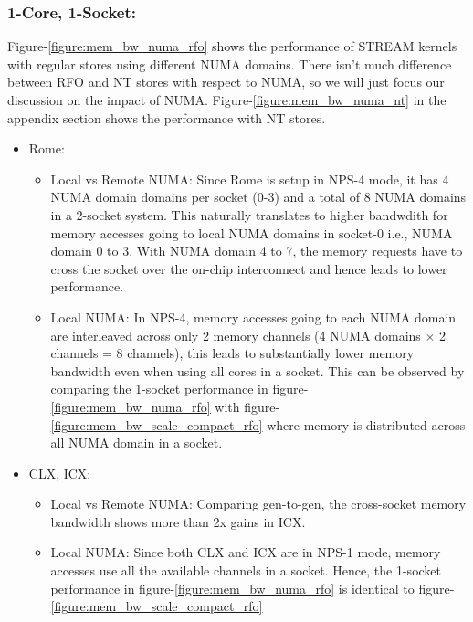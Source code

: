 \documentclass{article}
\begin{document}
\subsubsection{1-Core, 1-Socket:}
Figure-\ref{figure:mem_bw_numa_rfo} shows the performance of STREAM kernels with regular stores using different NUMA domains. There isn't much difference between RFO and NT stores with respect to NUMA, so we will just focus our discussion on the impact of NUMA. Figure-\ref{figure:mem_bw_numa_nt} in the appendix section shows the performance with NT stores.
\begin{itemize}
\item Rome:
\begin{itemize}
\item Local vs Remote NUMA: Since Rome is setup in NPS-4 mode, it has 4 NUMA domain domains per socket (0-3) and a total of 8 NUMA domains in a 2-socket system. This naturally translates to higher bandwdith for memory accesses going to local NUMA domains in socket-0 i.e., NUMA domain 0 to 3. With NUMA domain 4 to 7, the memory requests have to cross the socket over the on-chip interconnect and hence leads to lower performance.
\item Local NUMA: In NPS-4, memory accesses going to each NUMA domain are interleaved across only 2 memory channels (4 NUMA domains $\times$ 2 channels = 8 channels), this leads to substantially lower memory bandwidth even when using all cores in a socket. This can be observed by comparing the 1-socket performance in figure-\ref{figure:mem_bw_numa_rfo} with figure-\ref{figure:mem_bw_scale_compact_rfo} where memory is distributed across all NUMA domain in a socket.
\end{itemize}

\item CLX, ICX:
\begin{itemize}
\item Local vs Remote NUMA: Comparing gen-to-gen, the cross-socket memory bandwidth shows more than 2x gains in ICX.
\item Local NUMA: Since both CLX and ICX are in NPS-1 mode, memory accesses use all the available channels in a socket. Hence, the 1-socket performance in figure-\ref{figure:mem_bw_numa_rfo} is identical to figure-\ref{figure:mem_bw_scale_compact_rfo}
\end{itemize}
\end{itemize}
\end{document}

